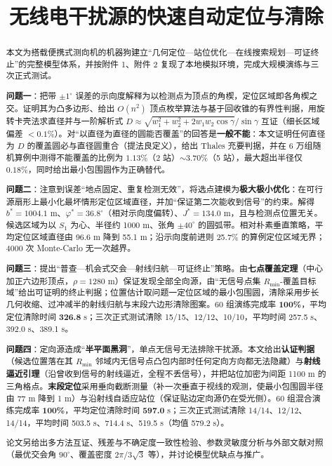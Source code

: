 \documentclass[withoutpreface,bwprint]{cumcmthesis}
\title{无线电干扰源的快速自动定位与清除}
\date{}
\begin{document}
\maketitle

\begin{abstract}
本文为搭载便携式测向机的机器狗建立“几何定位—站位优化—在线搜索规划—可证终止”的完整模型体系，并按附件 1、附件 2 复现了本地模拟环境，完成大规模演练与三次正式测试。

\textbf{问题一}：把带 $\pm1^{\circ}$ 误差的示向度解释为以检测点为顶点的角楔，定位区域即各角楔之交。证明其为凸多边形、给出 $O(n^2)$ 顶点枚举算法与基于回收锥的有界性判据，用旋转卡壳法求直径并与一阶解析式 $D\!\approx\!\sqrt{w_1^2\!+\!w_2^2\!+\!2w_1w_2\cos\gamma}/\sin\gamma$ 互证（细长区域偏差 $<0.1\%$）。对“以直径为直径的圆能否覆盖”的回答是\textbf{一般不能}：本文证明任何直径为 $D$ 的覆盖圆必与直径圆重合（提法良定义），给出 Thales 充要判据，并在 6 万组随机算例中测得不能覆盖的比例为 $1.13\%$（2 站）$\sim3.70\%$（5 站），最大超出半径仅 $0.18\%$，同时给出最小包围圆作为正确替代。

\textbf{问题二}：注意到误差“地点固定、重复检测无效”，将选点建模为\textbf{极大极小优化}：在可行源扇形上最小化最坏情形定位区域直径，并加“保证第二次能收到信号”的约束。解得 $b^{*}=1004.1$ m、$\varphi^{*}=36.8^{\circ}$（相对示向度偏转）、$J^{*}=134.0$ m，且与检测点位置无关。候选区域为以 $S_1$ 为心、半径约 1000 m、张角 $\pm40^{\circ}$ 的圆弧带。相对朴素垂直策略，平均定位区域直径由 96.6 m 降到 55.1 m；沿示向度前进则 25.7\% 的算例定位区域无界；4000 次 Monte-Carlo 无一次越界。

\textbf{问题三}：提出“普查—机会式交会—射线归航—可证终止”策略。由\textbf{七点覆盖定理}（中心加正六边形顶点，$\rho=1280$ m）保证发现全部全向源，由“无信号点集 $R_{\min}$-覆盖目标域”给出可证明的终止判据；位置估计取问题一定位区域的最小包围圆，清除采用步长几何收缩、过冲减半的射线归航与末段六边形清除图案。60 组演练完成率 \textbf{100\%}，平均定位清除时间 \textbf{326.8} s；三次正式测试清除 15/15、12/12、10/10，平均时间 257.5 s、392.0 s、389.1 s。

\textbf{问题四}：定向源造成“\textbf{半平面黑洞}”，单点无信号无法排除干扰源。本文给出\textbf{认证判据}（候选位置落在其 $R_{\min}$ 邻域内无信号点凸包内部时任何定向方向都无法隐藏）与\textbf{射线逼近引理}（沿曾收到信号的射线逼近，全程不丢信号），并把站位加密为间距 1100 m 的三角格点。\textbf{末段定位}采用垂向截断测量（补一次垂直于视线的观测，使最小包围圆半径由 77 m 降到 1 m）与沿射线自适应站位（保证贴边定向源仍在受光侧）。60 组混合演练完成率 \textbf{100\%}，平均定位清除时间 \textbf{597.0} s；三次正式测试清除 14/14、12/12、14/14，平均时间 503.5 s、714.4 s、519.5 s（均值 579.2 s）。

论文另给出多方法互证、残差与不确定度一致性检验、参数灵敏度分析与外部文献对照（最优交会角 $90^{\circ}$、覆盖密度 $2\pi/3\sqrt3$ 等），并讨论模型优缺点与推广。

\end{abstract}
\end{document}
